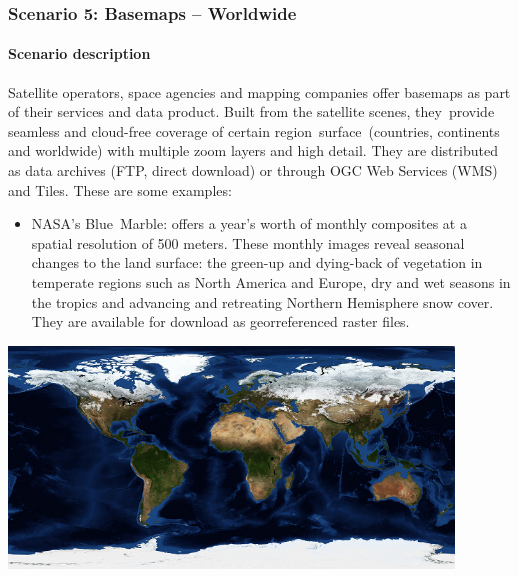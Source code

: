 \documentclass[a4paper]{article}
\newcommand\liststyleLFOxvi{%
\renewcommand\labelitemi{[F0B7?]}
\renewcommand\labelitemii{o}
\renewcommand\labelitemiii{[F0A7?]}
\renewcommand\labelitemiv{[F0B7?]}
}
\begin{document}
\bigskip

\clearpage
\bigskip

\subsubsection[Scenario 5: Basemaps {}-- Worldwide]{Scenario 5: Basemaps
-- Worldwide}
\hypertarget{Toc381777198}{}\paragraph[Scenario description]{Scenario
description}
Satellite operators, space agencies and mapping companies offer basemaps
as part of their services and data product. Built from the satellite
scenes, they\ provide seamless and cloud-free coverage of certain
region\ surface\ (countries, continents and worldwide) with multiple
zoom layers and high detail. They are distributed as data archives
(FTP, direct download) or through OGC Web Services (WMS) and Tiles.
These are some examples:


\bigskip

\liststyleLFOxvi
\begin{itemize}
\item NASA{\textquoteright}s Blue\ Marble: offers a
year{\textquoteright}s worth of monthly composites at a spatial
resolution of 500 meters. These monthly images reveal seasonal changes
to the land surface: the green-up and dying-back of vegetation in
temperate regions such as North America and Europe, dry and wet seasons
in the tropics and advancing and retreating Northern Hemisphere snow
cover. They are available for download as georreferenced raster
files.\ 
\end{itemize}

\bigskip

{\centering 
\includegraphics[width=4.65436in,height=2.32718in]{out-img15.png} \par}
\end{document}
